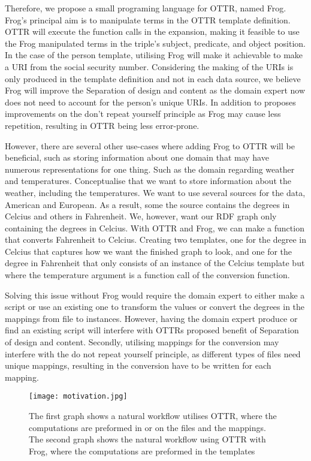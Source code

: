 \para 
Therefore, we propose a small programing language for OTTR, named Frog.  Frog's principal aim is to manipulate terms in the OTTR template definition. OTTR will execute the function calls in the expansion, making it feasible to use the Frog manipulated terms in the triple's subject, predicate, and object position. In the case of the person template, utilising Frog will make it achievable to make a URI from the social security number. Considering the making of the URIs is only produced in the template definition and not in each data source, we believe Frog will improve the Separation of design and content as the domain expert now does not need to account for the person's unique URIs. In addition to proposes improvements on the don't repeat yourself principle as Frog may cause less repetition, resulting in OTTR being less error-prone. 

\para
However, there are several other use-cases where adding Frog to OTTR will be beneficial, such as storing information about one domain that may have numerous representations for one thing. Such as the domain regarding weather and temperatures. Conceptualise that we want to store information about the weather, including the temperatures. We want to use several sources for the data, American and European. As a result, some the source contains the degrees in Celcius and others in Fahrenheit. We, however, want our RDF graph only containing the degrees in Celcius. With OTTR and Frog, we can make a function that converts Fahrenheit to Celcius. Creating two templates, one for the degree in Celcius that captures how we want the finished graph to look, and one for the degree in Fahrenheit that only consists of an instance of the Celcius template but where the temperature argument is a function call of the conversion function. 


\para
Solving this issue without Frog would require the domain expert to either make a script or use an existing one to transform the values or convert the degrees in the mappings from file to instances.  However, having the domain expert produce or find an existing script will interfere with OTTRs proposed benefit of Separation of design and content. Secondly, utilising mappings for the conversion may interfere with the do not repeat yourself principle, as different types of files need unique mappings, resulting in the conversion have to be written for each mapping. 


\begin{figure}
    \centering
    \texttt{[image: motivation.jpg]}
    \caption{The first graph shows a natural workflow utilises OTTR, where the computations are preformed in or on the files and the mappings. The second graph shows the natural workflow using OTTR with Frog, where the computations are preformed in the templates}
    \label{fig:MOTIVATION}
\end{figure}


